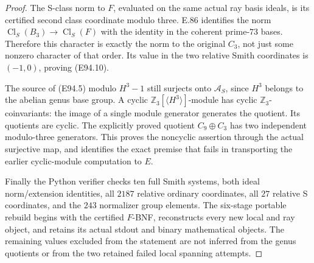 \begin{proof}
The S-class norm to \(F\), evaluated on the
same actual ray basis ideals, is its certified
second class coordinate modulo three. E.86
identifies the norm
\(\operatorname{Cl}_S(B_3)\to\operatorname{Cl}_S(F)\)
with the identity in the coherent prime-\(73\)
bases. Therefore this character is exactly
the norm to the original \(C_3\), not just
some nonzero character of that order.
Its value in the two relative Smith coordinates
is \((-1,0)\), proving (E94.10).

The source of (E94.5) modulo \(H^3-1\)
still surjects onto \(\mathcal A_S\), since
\(H^3\) belongs to the abelian genus base
group. A cyclic
\(\mathbb Z_3[\langle H^3\rangle]\)-module
has cyclic \(\mathbb Z_3\)-coinvariants:
the image of a single module generator
generates the quotient. Its quotients
are cyclic. The explicitly proved quotient
\(C_9\oplus C_3\) has two independent
modulo-three generators. This proves the
noncyclic assertion through the actual
surjective map, and identifies the exact
premise that fails in transporting the
earlier cyclic-module computation to \(E\).

Finally the Python verifier checks ten full
Smith systems, both ideal norm/extension
identities, all \(2187\) relative ordinary
coordinates, all \(27\) relative S coordinates,
and the \(243\) normalizer group elements.
The six-stage portable rebuild begins with
the certified \(F\)-BNF, reconstructs every
new local and ray object, and retains its
actual stdout and binary mathematical objects.
The remaining values excluded from the
statement are not inferred from the genus
quotients or from the two retained failed
local spanning attempts.
\end{proof}
